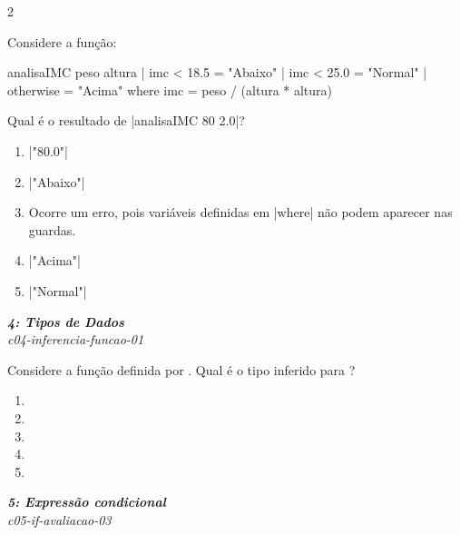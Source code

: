 \documentclass[a4paper,10pt,brazil]{article}
\begin{document}
\begin{multicols}{2}
\begin{flushright}
\end{flushright}
Considere a função:
\begin{haskellcode}
analisaIMC peso altura
  | imc < 18.5 = "Abaixo"
  | imc < 25.0 = "Normal"
  | otherwise  = "Acima"
  where
    imc = peso / (altura * altura)
\end{haskellcode}
Qual é o resultado de \haskellinline|analisaIMC 80 2.0|?

\begin{enumerate}
  \item \haskellinline|"80.0"|

  \item \haskellinline|"Abaixo"|

  \item Ocorre um erro, pois variáveis definidas em \haskellinline|where| não podem aparecer nas guardas.

  \item \haskellinline|"Acima"|

  \item \haskellinline|"Normal"|


\end{enumerate}

\begin{flushright}
  \footnotesize
  \textit{\textbf{4: Tipos de Dados}}\\
  \textit{c04-inferencia-funcao-01}\\

\end{flushright}
Considere a função definida por . Qual é o tipo inferido para ?

\begin{enumerate}
  \item {}

  \item {}

  \item {}

  \item {}

  \item {}


\end{enumerate}

\begin{flushright}
  \footnotesize
  \textit{\textbf{5: Expressão condicional}}\\
  \textit{c05-if-avaliacao-03}\\


\end{flushright}
\end{multicols}
\end{document}
